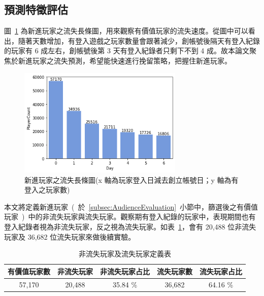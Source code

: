 \subsection{預測特徵評估}
\label{subsec:FeatureEvaluation}

圖~\ref{fig:eva_PlayerChurnPeriod} 為新進玩家之流失長條圖，用來觀察有價值玩家的流失速度。從圖中可以看出，隨著天數增加，有登入遊戲之玩家數量會跟著減少，創帳號後隔天有登入紀錄的玩家有 6 成左右，創帳號後第 3 天有登入紀錄者只剩下不到 4 成。故本論文聚焦於新進玩家之流失預測，希望能快速進行挽留策略，把握住新進玩家。

\begin{figure}[!htb]
    \begin{center}
      \includegraphics[width=0.7\textwidth]{figures/evaluation/Image_PlayerChurnPeriod.png}
      \caption[新進玩家之流失長條圖]{新進玩家之流失長條圖(x 軸為玩家登入日減去創立帳號日；y 軸為有登入之玩家數)}
      \label{fig:eva_PlayerChurnPeriod}
    \end{center}
\end{figure}

本文將定義新進玩家\ (\ 於~\ref{subsec:AudienceEvaluation}~小節中，篩選後之有價值玩家\ )\ 中的非流失玩家與流失玩家。觀察期有登入紀錄的玩家中，表現期間也有登入紀錄者視為非流失玩家，反之視為流失玩家。如表~\ref{tab:ChurnPlayerAndNonChurnPlayerDefinition}，會有 20,488 位非流失玩家及 36,682 位流失玩家來做後續實驗。

\begin{table}[!htb]
	\centering
	\begin{tabular}{ccccc}
	\hline \hline
	有價值玩家數 & 非流失玩家 & 非流失玩家占比 & 流失玩家數 & 流失玩家占比 \\
    \hline \hline
    57,170 & 20,488 & 35.84 \% & 36,682 & 64.16 \% \\
    \hline \hline
	\end{tabular}
	\caption[非流失玩家及流失玩家定義表]{非流失玩家及流失玩家定義表}
	\label{tab:ChurnPlayerAndNonChurnPlayerDefinition}
\end{table}
\newpage

